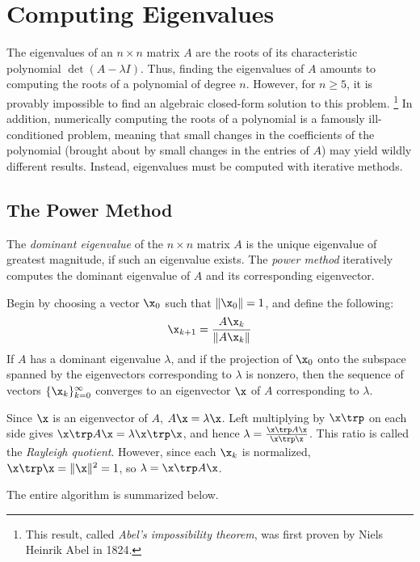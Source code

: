 \section*{Computing Eigenvalues} %

The eigenvalues of an $n \times n$ matrix $A$ are the roots of its characteristic polynomial $\det(A - \lambda I)$.
Thus, finding the eigenvalues of $A$ amounts to computing the roots of a polynomial of degree $n$.
However, for $n \ge 5$, it is provably impossible to find an algebraic closed-form solution to this problem.%
\footnote{This result, called \emph{Abel's impossibility theorem}, was first proven by Niels Heinrik Abel in 1824.}
In addition, numerically computing the roots of a polynomial is a famously ill-conditioned problem, meaning that small changes in the coefficients of the polynomial (brought about by small changes in the entries of $A$) may yield wildly different results.
Instead, eigenvalues must be computed with iterative methods.

\subsection*{The Power Method} %

The \emph{dominant eigenvalue} of the $n \times n$ matrix $A$ is the unique eigenvalue of greatest magnitude, if such an eigenvalue exists.
The \emph{power method} iteratively computes the dominant eigenvalue of $A$ and its corresponding eigenvector.

Begin by choosing a vector $\x_0$ such that $\|\x_0\|=1$, and define the following:
\[\x_{k+1}=\frac{A\x_k}{\|A\x_k\|}\]
If $A$ has a dominant eigenvalue $\lambda$, and if the projection of $\x_0$ onto the subspace spanned by the eigenvectors corresponding to $\lambda$ is nonzero, then the sequence of vectors $\{\x_k\}_{k=0}^\infty$ converges
to an eigenvector $\x$ of $A$ corresponding to $\lambda$.

Since $\x$ is an eigenvector of $A$, $A\x = \lambda \x$.
Left multiplying by $\x\trp$ on each side gives $\x\trp A\x = \lambda \x\trp\x$, and hence $\lambda = \frac{\x\trp A\x}{\x\trp\x}$.
This ratio is called the \emph{Rayleigh quotient}.
However, since each $\x_k$ is normalized, $\x\trp\x = \|\x\|^2 = 1$, so $\lambda = \x\trp A\x$.

The entire algorithm is summarized below.

